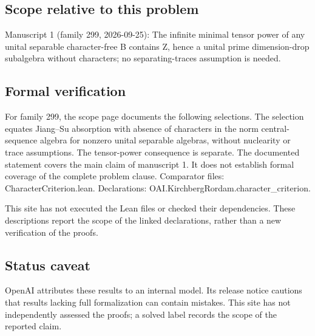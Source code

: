 \documentclass[11pt]{article}
\begin{document}
\subsection{Scope relative to this problem}
Manuscript 1 (family 299, 2026-09-25): The infinite minimal tensor power of any unital separable character-free B contains Z, hence a unital prime dimension-drop subalgebra without characters; no separating-traces assumption is needed.

\subsection{Formal verification}
For family 299, the scope page documents the following selections. The selection equates Jiang--Su absorption with absence of characters in the norm central-sequence algebra for nonzero unital separable algebras, without nuclearity or trace assumptions. The tensor-power consequence is separate. The documented statement covers the main claim of manuscript 1. It does not establish formal coverage of the complete problem clause. Comparator files: CharacterCriterion.lean. Declarations: OAI.KirchbergRordam.character\_criterion.

This site has not executed the Lean files or checked their dependencies. These descriptions report the scope of the linked declarations, rather than a new verification of the proofs.

\subsection{Status caveat}
OpenAI attributes these results to an internal model. Its release notice cautions that results lacking full formalization can contain mistakes. This site has not independently assessed the proofs; a solved label records the scope of the reported claim.
\end{document}
